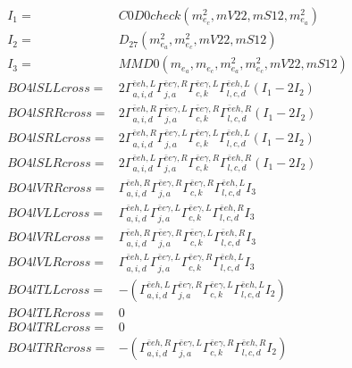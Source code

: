 \documentclass[A4,landscape]{article}
\begin{document}
\begin{align} 
I_1 = & C0D0check(m^2_{e_{{c}}}, mV22, mS12, m^2_{e_{{a}}}) \\ 
I_2 = & D_{27}(m^2_{e_{{a}}}, m^2_{e_{{c}}}, mV22, mS12) \\ 
I_3 = & MMD0(m_{e_{{a}}}, m_{e_{{c}}}, m^2_{e_{{a}}}, m^2_{e_{{c}}}, mV22, mS12) \\ 
  BO4lSLLcross= & 2  \Gamma^{\bar{e}e h ,L}_{a, i, d} \Gamma^{\bar{e}e \gamma ,R}_{j, a} \Gamma^{\bar{e}e \gamma ,L}_{c, k} \Gamma^{\bar{e}e h ,L}_{l, c, d} (I_1 - 2 I_2) \\ 
  BO4lSRRcross= & 2  \Gamma^{\bar{e}e h ,R}_{a, i, d} \Gamma^{\bar{e}e \gamma ,L}_{j, a} \Gamma^{\bar{e}e \gamma ,R}_{c, k} \Gamma^{\bar{e}e h ,R}_{l, c, d} (I_1 - 2 I_2) \\ 
  BO4lSRLcross= & 2  \Gamma^{\bar{e}e h ,R}_{a, i, d} \Gamma^{\bar{e}e \gamma ,L}_{j, a} \Gamma^{\bar{e}e \gamma ,L}_{c, k} \Gamma^{\bar{e}e h ,L}_{l, c, d} (I_1 - 2 I_2) \\ 
  BO4lSLRcross= & 2  \Gamma^{\bar{e}e h ,L}_{a, i, d} \Gamma^{\bar{e}e \gamma ,R}_{j, a} \Gamma^{\bar{e}e \gamma ,R}_{c, k} \Gamma^{\bar{e}e h ,R}_{l, c, d} (I_1 - 2 I_2) \\ 
  BO4lVRRcross= &  \Gamma^{\bar{e}e h ,R}_{a, i, d} \Gamma^{\bar{e}e \gamma ,R}_{j, a} \Gamma^{\bar{e}e \gamma ,R}_{c, k} \Gamma^{\bar{e}e h ,L}_{l, c, d} I_3 \\ 
  BO4lVLLcross= &  \Gamma^{\bar{e}e h ,L}_{a, i, d} \Gamma^{\bar{e}e \gamma ,L}_{j, a} \Gamma^{\bar{e}e \gamma ,L}_{c, k} \Gamma^{\bar{e}e h ,R}_{l, c, d} I_3 \\ 
  BO4lVRLcross= &  \Gamma^{\bar{e}e h ,R}_{a, i, d} \Gamma^{\bar{e}e \gamma ,R}_{j, a} \Gamma^{\bar{e}e \gamma ,L}_{c, k} \Gamma^{\bar{e}e h ,R}_{l, c, d} I_3 \\ 
  BO4lVLRcross= &  \Gamma^{\bar{e}e h ,L}_{a, i, d} \Gamma^{\bar{e}e \gamma ,L}_{j, a} \Gamma^{\bar{e}e \gamma ,R}_{c, k} \Gamma^{\bar{e}e h ,L}_{l, c, d} I_3 \\ 
  BO4lTLLcross= & -( \Gamma^{\bar{e}e h ,L}_{a, i, d} \Gamma^{\bar{e}e \gamma ,R}_{j, a} \Gamma^{\bar{e}e \gamma ,L}_{c, k} \Gamma^{\bar{e}e h ,L}_{l, c, d} I_2) \\ 
  BO4lTLRcross= & 0 \\ 
  BO4lTRLcross= & 0 \\ 
  BO4lTRRcross= & -( \Gamma^{\bar{e}e h ,R}_{a, i, d} \Gamma^{\bar{e}e \gamma ,L}_{j, a} \Gamma^{\bar{e}e \gamma ,R}_{c, k} \Gamma^{\bar{e}e h ,R}_{l, c, d} I_2) \\ 
\end{align} 
\end{document}
